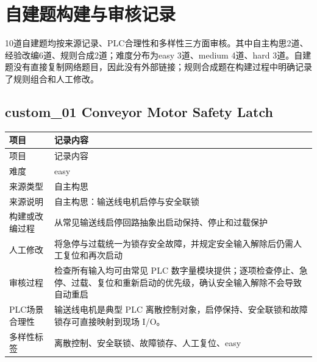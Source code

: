 
\begingroup

\small

\section{自建题构建与审核记录}

10道自建题均按来源记录、PLC合理性和多样性三方面审核。其中自主构思2道、经验改编6道、规则合成2道；难度分布为easy 3道、medium 4道、hard 3道。自建题没有直接复制网络题目，因此没有外部链接；规则合成题在构建过程中明确记录了规则组合和人工修改。

\subsection{{\ttfamily custom\_01} Conveyor Motor Safety Latch}

\begin{longtable}{L{3.0cm}L{10.3cm}}

\toprule

项目 & 记录内容\\

\midrule

\endfirsthead

\toprule

项目 & 记录内容\\

\midrule

\endhead

难度 & easy\\

来源类型 & 自主构思\\

来源说明 & 自主构思：输送线电机启停与安全联锁\\

构建或改编过程 & 从常见输送线启停回路抽象出启动保持、停止和过载保护\\

人工修改 & 将急停与过载统一为锁存安全故障，并规定安全输入解除后仍需人工复位和再次启动\\

审核过程 & 检查所有输入均可由常见 PLC 数字量模块提供；逐项检查停止、急停、过载、复位和重新启动的优先级，确认安全输入解除不会导致自动重启\\

PLC场景合理性 & 输送线电机是典型 PLC 离散控制对象，启停保持、安全联锁和故障锁存可直接映射到现场 I/O。\\

多样性标签 & 离散控制、安全联锁、故障锁存、人工复位、easy\\

\bottomrule

\end{longtable}

